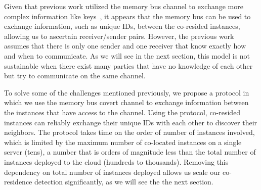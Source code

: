 Given that previous work utilized the memory bus channel to exchange more
complex information like keys~\cite{wuusenix2012}, it appears that the memory
bus can be used to exchange information, such as unique IDs, between the
co-resided instances, allowing us to ascertain receiver/sender pairs.  However,
the previous work assumes that there is only one sender and one receiver that
know exactly how and when to communicate. As we will see in the next section,
this model is not sustainable when there exist many parties that have no
knowledge of each other but try to communicate on the same channel.

To solve some of the challenges mentioned previously, we propose a protocol in
which we use the memory bus covert channel to exchange information between the
instances that have access to the channel. Using the protocol, co-resided
instances can reliably exchange their unique IDs with each other to discover
their neighbors. The protocol takes time on the order of number of instances
involved, which is limited by the maximum number of co-located instances on a
single server (tens), a number that is orders of magnitude less than the total
number of instances deployed to the cloud (hundreds to thousands). Removing this
dependency on total number of instances deployed allows us scale our co-residence
detection significantly, as we will see the the next section.
